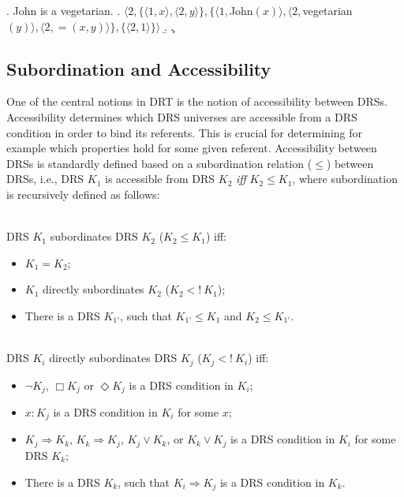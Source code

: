 \ex. John is a vegetarian.
\a. $\langle 2,\{\langle 1, x\rangle, \langle 2, y\rangle\},\{\langle1, 
      $John$(x)\rangle,\langle2, $vegetarian$(y)\rangle, \langle 2, =(x,y)
      \rangle\},\{\langle 2,1\rangle\}\rangle$
\b. 
\c. 


\subsection{Subordination and Accessibility}

One of the central notions in DRT is the notion of accessibility between
DRSs. Accessibility determines which DRS universes are accessible from a DRS
condition in order to bind its referents. This is crucial for determining
for example which properties hold for some given referent.  Accessibility
between DRSs is standardly defined based on a subordination relation
($\leq$) between DRSs, i.e., DRS $K_1$ is accessible from DRS $K_2$
\textit{iff} $K_2\leq K_1$, where subordination is recursively defined as
follows:

\begin{definition}\label{def:DRSsub}~\\
DRS $K_1$ subordinates DRS $K_2$ ($K_2 \leq K_1$) iff:
  \begin{itemize}
    \item $K_1 = K_2$;
    \item $K_1$ directly subordinates $K_2$ ($K_2 <!~K_1$);
    \item There is a DRS $K_{1'}$, such that $K_{1'} \leq K_1$ and 
      $K_2 \leq K_{1'}$.
  \end{itemize}
\end{definition}

\begin{subdefinition}~\\
DRS $K_i$ directly subordinates DRS $K_j$ ($K_j <!~K_i$) iff:
  \begin{itemize}
    \item $\neg K_j$, $\Box K_j$ or $\Diamond K_j$ is a DRS condition in
      $K_i$;
    \item $x:K_j$ is a DRS condition in $K_i$ for some $x$;
    \item $K_j \Rightarrow K_k$, $K_k \Rightarrow K_j$, $K_j \vee K_k$, or 
      $K_k \vee K_j$ is a DRS condition in $K_i$ for some DRS $K_k$;
    \item There is a DRS $K_k$, such that $K_i \Rightarrow K_j$
      is a DRS condition in $K_k$.
  \end{itemize}
\end{subdefinition}


